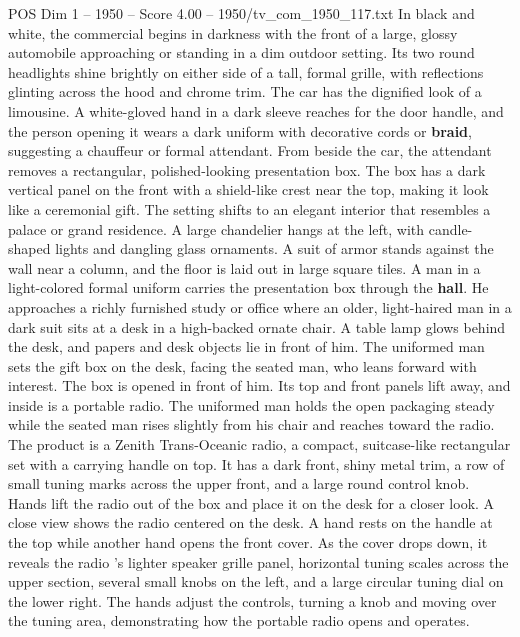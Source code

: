 \begin{textsample}{POS Dim 1 – 1950 – Score 4.00 – 1950/tv\_com\_1950\_117.txt}  \label{ex:f1_pos_090}
In black and white, the commercial begins in darkness with the front of a large, glossy automobile approaching or standing in a dim outdoor setting.
Its two round headlights shine brightly on either side of a tall, formal grille, with reflections glinting across the hood and chrome trim.
The car has the dignified look of a limousine.
A white-gloved hand in a dark sleeve reaches for the door handle, and the person opening it wears a dark uniform with decorative cords or \textbf{braid}, suggesting a chauffeur or formal attendant.
From beside the car, the attendant removes a rectangular, polished-looking presentation box.
The box has a dark vertical panel on the front with a shield-like crest near the top, making it look like a ceremonial gift.
The setting shifts to an elegant interior that resembles a palace or grand residence.
A large chandelier hangs at the left, with candle-shaped lights and dangling glass ornaments.
A suit of armor stands against the wall near a column, and the floor is laid out in large square tiles.
A man in a light-colored formal uniform carries the presentation box through the \textbf{hall}.
He approaches a richly furnished study or office where an older, light-haired man in a dark suit sits at a desk in a high-backed ornate chair.
A table lamp glows behind the desk, and papers and desk objects lie in front of him.
The uniformed man sets the gift box on the desk, facing the seated man, who leans forward with interest.
The box is opened in front of him.
Its top and front panels lift away, and inside is a portable radio.
The uniformed man holds the open packaging steady while the seated man rises slightly from his chair and reaches toward the radio.
The product is a Zenith Trans-Oceanic radio, a compact, suitcase-like rectangular set with a carrying handle on top.
It has a dark front, shiny metal trim, a row of small tuning marks across the upper front, and a large round control knob.
Hands lift the radio out of the box and place it on the desk for a closer look.
A close view shows the radio centered on the desk.
A hand rests on the handle at the top while another hand opens the front cover.
As the cover drops down, it reveals the radio ’s lighter speaker grille panel, horizontal tuning scales across the upper section, several small knobs on the left, and a large circular tuning dial on the lower right.
The hands adjust the controls, turning a knob and moving over the tuning area, demonstrating how the portable radio opens and operates.

\end{textsample}
